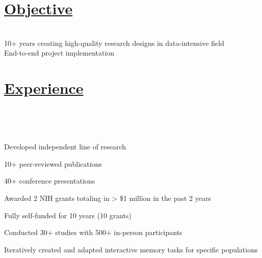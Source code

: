 \documentclass[]{winter-resume-openfont}
\begin{document}
\begin{minipage}[t]{0.65\textwidth}
\sectionsep
\sectionsep

\section{\underline{Objective}}
\sectionsep

 \\
\textbullet{} 10+ years creating high-quality research designs in data-intensive field \\
\textbullet{} End-to-end project implementation

\sectionsep
\sectionsep
\section{\underline{Experience}}
\sectionsep
{} \\

\sectionsep

 \\
\sectionsep
{}
\vspace{\topsep}
\begin{tightemize}
\item Developed independent line of research
\item 10+ peer-reviewed publications
\item 40+ conference presentations
\item Awarded 2 NIH grants totaling in > \$1 million in the past 2 years
\item Fully self-funded for 10 years (10 grants)
\end{tightemize}

\begin{tightemize}
\item Conducted 30+ studies with 500+ in-person participants
\item Iteratively created and adapted interactive memory tasks for specific populations
\end{tightemize}



\end{minipage}
\end{document}
